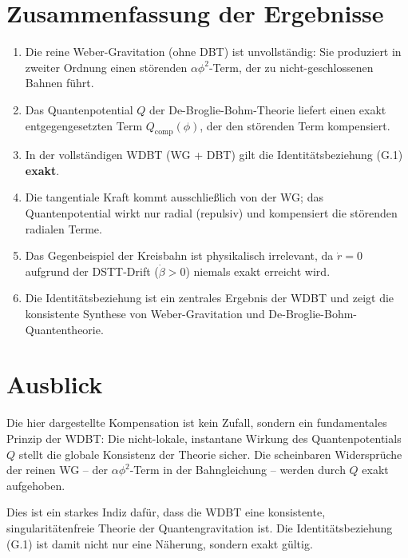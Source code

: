 \section{Zusammenfassung der Ergebnisse}
\label{app:identitaet_zusammenfassung}

\begin{enumerate}
    \item Die reine Weber-Gravitation (ohne DBT) ist unvollständig: Sie 
          produziert in zweiter Ordnung einen störenden \(\alpha\phi^2\)-Term, 
          der zu nicht-geschlossenen Bahnen führt.
    
    \item Das Quantenpotential \(Q\) der De-Broglie-Bohm-Theorie liefert 
          einen exakt entgegengesetzten Term \(Q_{\text{comp}}(\phi)\), 
          der den störenden Term kompensiert.
    
    \item In der vollständigen WDBT (WG + DBT) gilt die Identitätsbeziehung 
          (G.1) \textbf{exakt}.
    
    \item Die tangentiale Kraft kommt ausschließlich von der WG; das 
          Quantenpotential wirkt nur radial (repulsiv) und kompensiert 
          die störenden radialen Terme.
    
    \item Das Gegenbeispiel der Kreisbahn ist physikalisch irrelevant, 
          da \(\dot{r} = 0\) aufgrund der DSTT-Drift (\(\dot{\beta} > 0\)) 
          niemals exakt erreicht wird.
    
    \item Die Identitätsbeziehung ist ein zentrales Ergebnis der WDBT 
          und zeigt die konsistente Synthese von Weber-Gravitation und 
          De-Broglie-Bohm-Quantentheorie.
\end{enumerate}

\section{Ausblick}
\label{app:identitaet_ausblick}

Die hier dargestellte Kompensation ist kein Zufall, sondern ein 
fundamentales Prinzip der WDBT: Die nicht-lokale, instantane Wirkung 
des Quantenpotentials \(Q\) stellt die globale Konsistenz der Theorie 
sicher. Die scheinbaren Widersprüche der reinen WG – der 
\(\alpha\phi^2\)-Term in der Bahngleichung – werden durch \(Q\) exakt 
aufgehoben.

Dies ist ein starkes Indiz dafür, dass die WDBT eine konsistente, 
singularitätenfreie Theorie der Quantengravitation ist. Die 
Identitätsbeziehung (G.1) ist damit nicht nur eine Näherung, sondern 
exakt gültig.